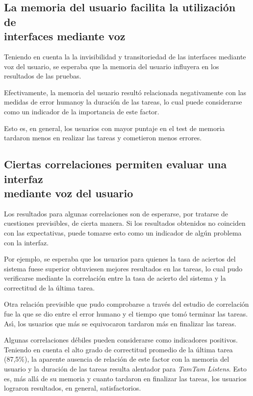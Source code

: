 \subsection[La memoria del usuario facilita la utilizaci\'on de interfaces \\ mediante voz]
{La memoria del usuario facilita la utilizaci\'on de \\ interfaces mediante voz}
Teniendo en cuenta la la invisibilidad y transitoriedad de las interfaces mediante
voz del usuario, se esperaba que la memoria del usuario influyera en los resultados de
las pruebas.

Efectivamente, la memoria del usuario result\'o relacionada negativamente con las medidas 
de error humanoy la duraci\'on de las tareas, lo cual puede considerarse como un indicador de 
la importancia de este factor.

Esto es, en general, los usuarios con mayor puntaje en el test de memoria
tardaron menos en realizar las tareas y cometieron menos errores.

\subsection[Ciertas correlaciones permiten evaluar una interfaz mediante voz del usuario]
{Ciertas correlaciones permiten evaluar una interfaz \\ mediante voz del usuario}
Los resultados para algunas correlaciones son de esperarse, por tratarse de cuestiones
previsibles, de cierta manera. Si los resultados obtenidos no coinciden con las expectativas,
puede tomarse esto como un indicador de alg\'un problema con la interfaz. 

Por ejemplo, se esperaba que los usuarios para quienes la tasa de aciertos del sistema fuese superior
obtuviesen mejores resultados en las tareas, lo cual pudo verificarse mediante la correlaci\'on 
entre la tasa de acierto del sistema y la correctitud de la \'ultima tarea.

Otra relaci\'on previsible que pudo comprobarse a trav\'es del estudio de correlaci\'on fue la que
se dio entre el error humano y el tiempo que tom\'o terminar las tareas. As{{\'\i}}, los usuarios que
m\'as se equivocaron tardaron m\'as en finalizar las tareas.

Algunas correlaciones d\'ebiles pueden considerarse como indicadores positivos. Teniendo en cuenta
el alto grado de correctitud promedio de la \'ultima tarea (87,5\%), la aparente ausencia de relaci\'on 
de este factor con la memoria del usuario y la duraci\'on de las tareas resulta alentador para
\emph{TamTam Listens}. Esto es, m\'as all\'a de su memoria y cuanto tardaron en finalizar las tareas,
los usuarios lograron resultados, en general, satisfactorios.

